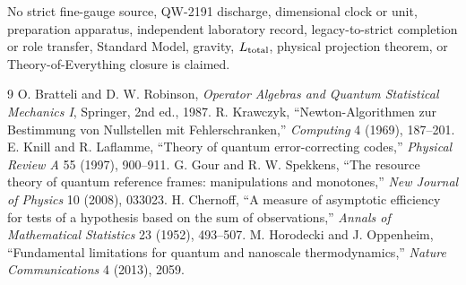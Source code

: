 \documentclass[11pt,a4paper]{article}
\begin{document}
No strict fine-gauge source, QW-2191 discharge, dimensional clock or unit, preparation apparatus, independent laboratory record, legacy-to-strict completion or role transfer, Standard Model, gravity, $L_{\rm total}$, physical projection theorem, or Theory-of-Everything closure is claimed.

\begin{thebibliography}{9}
 O. Bratteli and D. W. Robinson, \emph{Operator Algebras and Quantum Statistical Mechanics I}, Springer, 2nd ed., 1987.
 R. Krawczyk, ``Newton-Algorithmen zur Bestimmung von Nullstellen mit Fehlerschranken,'' \emph{Computing} 4 (1969), 187--201.
 E. Knill and R. Laflamme, ``Theory of quantum error-correcting codes,'' \emph{Physical Review A} 55 (1997), 900--911.
 G. Gour and R. W. Spekkens, ``The resource theory of quantum reference frames: manipulations and monotones,'' \emph{New Journal of Physics} 10 (2008), 033023.
 H. Chernoff, ``A measure of asymptotic efficiency for tests of a hypothesis based on the sum of observations,'' \emph{Annals of Mathematical Statistics} 23 (1952), 493--507.
 M. Horodecki and J. Oppenheim, ``Fundamental limitations for quantum and nanoscale thermodynamics,'' \emph{Nature Communications} 4 (2013), 2059.
\end{thebibliography}
\end{document}
